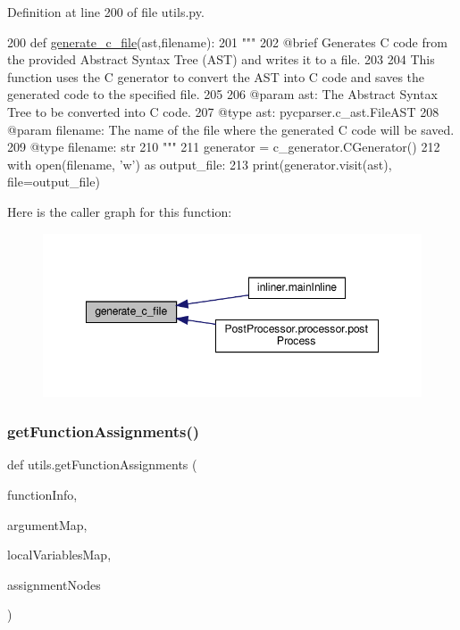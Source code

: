 Definition at line 200 of file utils.\+py.


\begin{DoxyCode}
200 \textcolor{keyword}{def }\hyperlink{namespacePostProcessor_1_1utils_a998fb471074ff747973a0d974eb9fbd1}{generate\_c\_file}(ast,filename):
201     \textcolor{stringliteral}{"""
}
202 \textcolor{stringliteral}{    @brief Generates C code from the provided Abstract Syntax Tree (AST) and writes it to a file.
}
203 \textcolor{stringliteral}{
}
204 \textcolor{stringliteral}{    This function uses the C generator to convert the AST into C code and saves the generated code to the
       specified file.
}
205 \textcolor{stringliteral}{
}
206 \textcolor{stringliteral}{    @param ast: The Abstract Syntax Tree to be converted into C code.
}
207 \textcolor{stringliteral}{    @type ast: pycparser.c\_ast.FileAST
}
208 \textcolor{stringliteral}{    @param filename: The name of the file where the generated C code will be saved.
}
209 \textcolor{stringliteral}{    @type filename: str
}
210 \textcolor{stringliteral}{    """}
211     generator = c\_generator.CGenerator()
212     with open(filename, \textcolor{stringliteral}{'w'}) \textcolor{keyword}{as} output\_file:
213         print(generator.visit(ast), file=output\_file)
\end{DoxyCode}
Here is the caller graph for this function\+:\nopagebreak
\begin{figure}[H]
\begin{center}
\leavevmode
\includegraphics[width=348pt]{namespaceutils_a5ab527c9affdfd39949f2e88c4299989_icgraph}
\end{center}
\end{figure}
\mbox{\label{namespaceutils_a04fa4bbfa41595f584571fb61a6047c5}} 
\subsubsection{\texorpdfstring{get\+Function\+Assignments()}{getFunctionAssignments()}}
{\footnotesize\ttfamily def utils.\+get\+Function\+Assignments (\begin{DoxyParamCaption}\item[{}]{function\+Info,  }\item[{}]{argument\+Map,  }\item[{}]{local\+Variables\+Map,  }\item[{}]{assignment\+Nodes }\end{DoxyParamCaption})}

